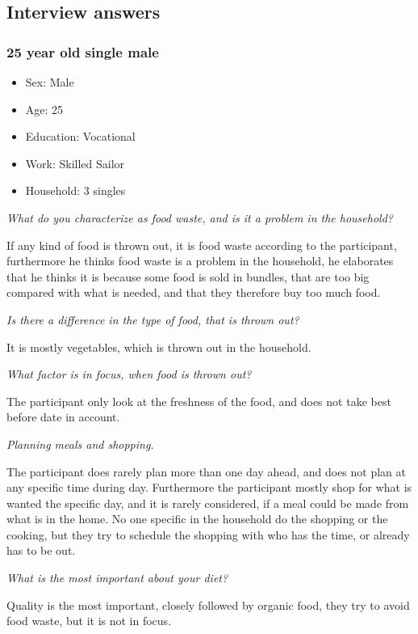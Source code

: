 \subsection{Interview answers}\label{Interview}
\subsubsection{25 year old single male}
\begin{itemize}
  \item Sex: Male
  \item Age: 25
  \item Education: Vocational
  \item Work: Skilled Sailor
  \item Household: 3 singles
\end{itemize}
\emph{What do you characterize as food waste, and is it a problem in the household?}

If any kind of food is thrown out, it is food waste according to the participant, furthermore he thinks food waste is a problem in the household, he elaborates that he thinks it is because some food is sold in bundles, that are too big compared with what is needed, and that they therefore buy too much food.

\emph{Is there a difference in the type of food, that is thrown out?}

It is mostly vegetables, which is thrown out in the household.

\emph{What factor is in focus, when food is thrown out?}

The participant only look at the freshness of the food, and does not take best before date in account.

\emph{Planning meals and shopping.}

The participant does rarely plan more than one day ahead, and does not plan at any specific time during day. Furthermore the participant mostly shop for what is wanted the specific day, and it is rarely considered, if a meal could be made from what is in the home. No one specific in the household do the shopping or the cooking, but they try to schedule the shopping with who has the time, or already has to be out.

\emph{What is the most important about your diet?}

Quality is the most important, closely followed by organic food, they try to avoid food waste, but it is not in focus.

